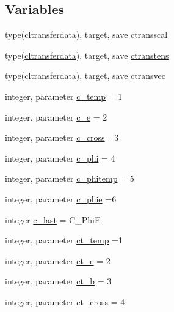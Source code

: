 \subsection*{Variables}
\begin{DoxyCompactItemize}
\item 
type(\mbox{\hyperlink{structmodeldata_1_1cltransferdata}{cltransferdata}}), target, save \mbox{\hyperlink{namespacemodeldata_a34bd8af8076e850aa1bd0bd9979be120}{ctransscal}}
\item 
type(\mbox{\hyperlink{structmodeldata_1_1cltransferdata}{cltransferdata}}), target, save \mbox{\hyperlink{namespacemodeldata_a432da70b3966012f72663b1b37c5f44d}{ctranstens}}
\item 
type(\mbox{\hyperlink{structmodeldata_1_1cltransferdata}{cltransferdata}}), target, save \mbox{\hyperlink{namespacemodeldata_ad30179531817ef1d8f3c57eeb179702d}{ctransvec}}
\item 
integer, parameter \mbox{\hyperlink{namespacemodeldata_ab144c0dde977b1695db87bc0a2eb3906}{c\+\_\+temp}} = 1
\item 
integer, parameter \mbox{\hyperlink{namespacemodeldata_a1697c6436c81028fc5378aa20c691bc6}{c\+\_\+e}} = 2
\item 
integer, parameter \mbox{\hyperlink{namespacemodeldata_a3b2071eab09222beb5e8e06ccd8764f3}{c\+\_\+cross}} =3
\item 
integer, parameter \mbox{\hyperlink{namespacemodeldata_ae74d57bf66536040e60bd4e100a29a78}{c\+\_\+phi}} = 4
\item 
integer, parameter \mbox{\hyperlink{namespacemodeldata_a55f3705dd9a17416caa44b692f8bd38c}{c\+\_\+phitemp}} = 5
\item 
integer, parameter \mbox{\hyperlink{namespacemodeldata_a0b2ffa13b78be0e1097e0696f61b3d67}{c\+\_\+phie}} =6
\item 
integer \mbox{\hyperlink{namespacemodeldata_a775752af289f0f86e09da60b795fd542}{c\+\_\+last}} = C\+\_\+\+PhiE
\item 
integer, parameter \mbox{\hyperlink{namespacemodeldata_a0852164e9866929946aab4fdf78ca2b2}{ct\+\_\+temp}} =1
\item 
integer, parameter \mbox{\hyperlink{namespacemodeldata_a5fa8e9929dddc8461255d21037ce5817}{ct\+\_\+e}} = 2
\item 
integer, parameter \mbox{\hyperlink{namespacemodeldata_ae2b16c12d10fc3ad1bf9b8bcda35fa19}{ct\+\_\+b}} = 3
\item 
integer, parameter \mbox{\hyperlink{namespacemodeldata_a76668d6bad37db06c7b9a47cdeba14dc}{ct\+\_\+cross}} = 4

\end{DoxyCompactItemize}
